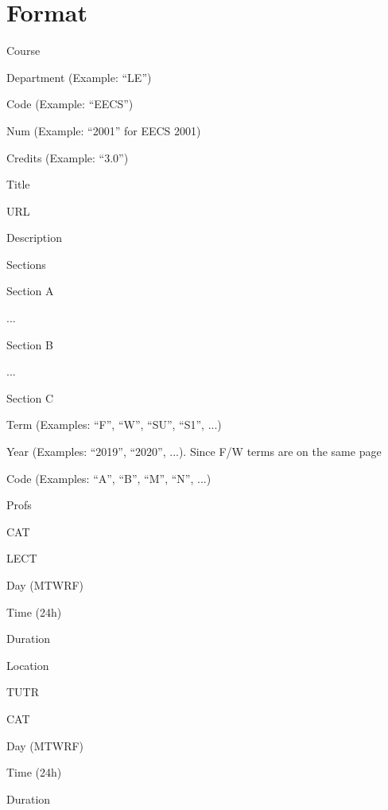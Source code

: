 \section{Format}
\noindent Course
\begin{itemize*}
	\item Department (Example: ``LE'')
	\item Code (Example: ``EECS'')
	\item Num (Example: ``2001'' for EECS 2001)
	\item Credits (Example: ``3.0'')
	\item Title
	\item URL
	\item Description
	\item Sections
	\begin{itemize*}
		\item Section A
		\begin{itemize*}
			\item ...
		\end{itemize*}
		\item Section B
		\begin{itemize*}
			\item ...
		\end{itemize*}
		\item Section C
		\begin{itemize*}
			\item Term (Examples: ``F'', ``W'', ``SU'', ``S1'', ...)
			\item Year (Examples: ``2019'', ``2020'', ...). Since F/W terms are on the same page
			\item Code (Examples: ``A'', ``B'', ``M'', ``N'', ...)
			\item Profs
			\item CAT
			\item LECT
			\begin{itemize*}
				\item Day (MTWRF)
				\item Time (24h)
				\item Duration
				\item Location
			\end{itemize*}
			\item TUTR
			\begin{itemize*}
				\item CAT
				\item Day (MTWRF)
				\item Time (24h)
				\item Duration

\end{itemize*}
\end{itemize*}
\end{itemize*}
\end{itemize*}
